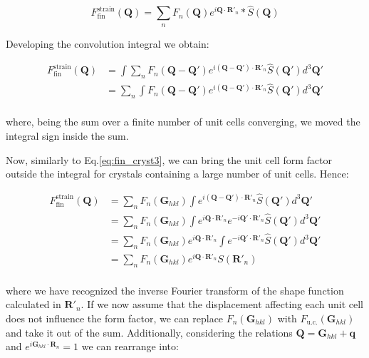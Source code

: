 \begin{equation}
    F^{\text{strain}}_{\text{fin}}(\mathbf{Q}) = 
    \sum_{n} F_n(\mathbf{Q}) e^{i \mathbf{Q} \cdot \mathbf{R}'_n} \ast \widehat{S}(\mathbf{Q})
   \label{eq:strain_fin}
\end{equation}

Developing the convolution integral we obtain: 

\begin{equation}
    \begin{aligned}
    F^{\text{strain}}_{\text{fin}}(\mathbf{Q}) &= 
    \int \sum_{n} F_n(\mathbf{Q} -\mathbf{Q'}) e^{i (\mathbf{Q}-\mathbf{Q'}) \cdot \mathbf{R}'_n} \widehat{S}(\mathbf{Q'})d^3\mathbf{Q'} \\
    &= \sum_{n} \int F_n(\mathbf{Q} -\mathbf{Q'}) e^{i (\mathbf{Q}-\mathbf{Q'}) \cdot \mathbf{R}'_n} \widehat{S}(\mathbf{Q'})d^3\mathbf{Q'} \\ 
   \label{eq:strain_fin2}
    \end{aligned}
\end{equation}

where, being the sum over a finite number of unit cells converging, we moved the integral sign inside the sum. 

Now, similarly to Eq.\ref{eq:fin_cryst3}, we can bring the unit cell form factor outside the integral for crystals containing 
a large number of unit cells.  
Hence: 

\begin{equation}
    \begin{aligned}
    F^{\text{strain}}_{\text{fin}}(\mathbf{Q}) &=  
    \sum_{n} F_n(\mathbf{G}_{hkl}) \int  e^{i (\mathbf{Q} -\mathbf{Q'}) \cdot \mathbf{R}'_n} \widehat{S}(\mathbf{Q'})d^3\mathbf{Q'} \\ 
    &= \sum_{n} F_n(\mathbf{G}_{hkl}) \int  e^{i \mathbf{Q} \cdot \mathbf{R}'_n } e^{-i \mathbf{Q'} \cdot \mathbf{R}'_n} \widehat{S}(\mathbf{Q'})d^3\mathbf{Q'} \\ 
    &= \sum_{n} F_n(\mathbf{G}_{hkl}) e^{i \mathbf{Q} \cdot \mathbf{R}'_n } \int e^{-i \mathbf{Q'} \cdot \mathbf{R}'_n} \widehat{S}(\mathbf{Q'})d^3\mathbf{Q'} \\ 
    &= \sum_{n} F_n(\mathbf{G}_{hkl}) e^{i \mathbf{Q} \cdot \mathbf{R}'_n } S(\mathbf{R}'_n) \\
   \label{eq:strain_fin3}
    \end{aligned}
\end{equation}

where we have recognized the inverse Fourier transform of the shape function calculated in $\mathbf{R}'_n$. 
If we now assume that the displacement affecting each unit cell does not influence the form factor, 
we can replace $F_n(\mathbf{G}_{hkl})$ with $F_{\text{u.c.}}(\mathbf{G}_{hkl})$ and take it out of the sum. 
Additionally, considering the relations $\mathbf{Q} = \mathbf{G}_{hkl} + \mathbf{q}$ and $e^{i \mathbf{G}_{hkl} \cdot \mathbf{R}_n}  = 1$
we can rearrange into: 

